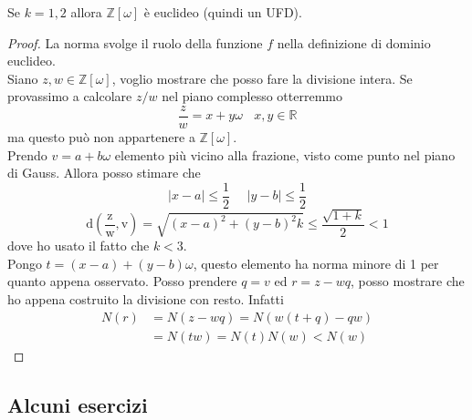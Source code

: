 \begin{proposizione}
	Se $k=1,2$ allora $\mathbb{Z}[\omega]$ è euclideo (quindi un UFD).
\end{proposizione}
\begin{proof}
	La norma svolge il ruolo della funzione $f$ nella definizione di dominio euclideo.\\ Siano $z,w\in\mathbb{Z}[\omega]$, voglio mostrare che posso fare la divisione intera.
	Se provassimo a calcolare $z/w$ nel piano complesso otterremmo 
	\begin{equation*}
	\frac{z}{w}=x+y\omega \ \ \ \ x,y\in\mathbb{R}
	\end{equation*}
	ma questo può non appartenere a $\mathbb{Z}[\omega]$. \\ Prendo $v=a+b\omega$ elemento più vicino alla frazione, visto come punto nel piano di Gauss. Allora posso stimare che 
	\begin{equation*}
	|x-a|\leq\frac{1}{2} \ \ \ \ \ \ |y-b|\leq\frac{1}{2}
	\end{equation*}
	\begin{equation*}
	\operatorname{d\left(\frac{z}{w},v\right)}=\sqrt{(x-a)^2+(y-b)^2k}\leq\frac{\sqrt{1+k}}{2}<1
	\end{equation*}
	dove ho usato il fatto che $k<3$. \\ Pongo $t=(x-a)+(y-b)\omega$, questo elemento ha norma minore di 1 per quanto appena osservato. Posso prendere $q=v$ ed $r=z-wq$, posso mostrare che ho appena costruito la divisione con resto. Infatti
	\begin{align*}
	N(r)&=N(z-wq)=N\left(w(t+q)-qw\right)\\
	&=N(tw)=N(t)N(w)<N(w)
	\end{align*}
\end{proof}




\subsection{Alcuni esercizi}

